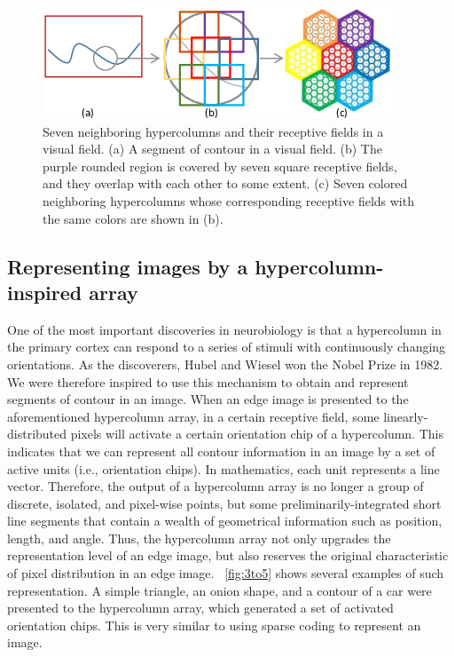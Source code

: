 \documentclass{article}
\begin{document}
\begin{figure}[!t]
\centering
\includegraphics[width=0.8\linewidth]{images/fig2.png}
\caption{Seven neighboring hypercolumns and their receptive fields in a visual field. 
(a) A segment of contour in a visual field. 
(b) The purple rounded region is covered by seven square receptive fields, 
and they overlap with each other to some extent. 
(c) Seven colored neighboring hypercolumns whose corresponding receptive fields with the same colors 
are shown in (b).}
\label{fig:2}
\end{figure}

\subsection{Representing images by a hypercolumn-inspired array}

One of the most important discoveries in neurobiology is that a hypercolumn in the primary cortex can respond to a series of stimuli with continuously changing orientations. 
As the discoverers, Hubel and Wiesel won the Nobel Prize in 1982. 
We were therefore inspired to use this mechanism to obtain and represent segments of contour in an image. 
When an edge image is presented to the aforementioned hypercolumn array, 
in a certain receptive field, 
some linearly-distributed pixels will activate a certain orientation chip of a hypercolumn. 
This indicates that we can represent all contour information in an image by a set of active units (i.e., orientation chips). In mathematics, each unit represents a line vector. Therefore, the output of a hypercolumn array is no longer a group of discrete, isolated, and pixel-wise points, 
but some preliminarily-integrated short line segments that contain a wealth of geometrical information such as position, length, and angle. 
Thus, the hypercolumn array not only upgrades the representation level of an edge image, 
but also reserves the original characteristic of pixel distribution in an edge image. 
\figurename~\ref{fig:3to5} shows several examples of such representation.
A simple triangle, an onion shape, and a contour of a car were presented to the hypercolumn array,
which generated a set of activated orientation chips.
This is very similar to using sparse coding to represent an image.
\end{document}

